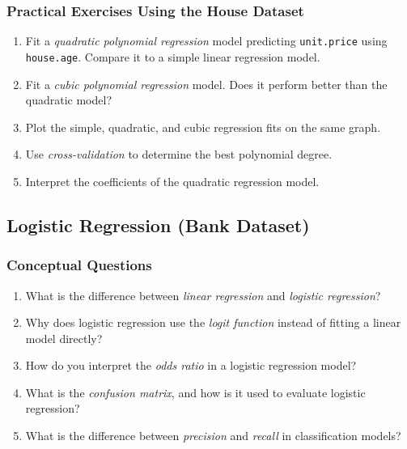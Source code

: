 \documentclass[
]{book}
\newcommand{\passthrough}[1]{#1}
\providecommand{\tightlist}{%
  \setlength{\itemsep}{0pt}\setlength{\parskip}{0pt}}
\theoremstyle{definition}
\theoremstyle{definition}
\theoremstyle{definition}
\theoremstyle{definition}
\theoremstyle{remark}
\begin{document}
\subsubsection*{Practical Exercises Using the House Dataset}\label{practical-exercises-using-the-house-dataset-1}

\begin{enumerate}
\def\labelenumi{\arabic{enumi}.}
\setcounter{enumi}{29}
\tightlist
\item
  Fit a \emph{quadratic polynomial regression} model predicting \passthrough{\lstinline!unit.price!} using \passthrough{\lstinline!house.age!}. Compare it to a simple linear regression model.\\
\item
  Fit a \emph{cubic polynomial regression} model. Does it perform better than the quadratic model?\\
\item
  Plot the simple, quadratic, and cubic regression fits on the same graph.\\
\item
  Use \emph{cross-validation} to determine the best polynomial degree.\\
\item
  Interpret the coefficients of the quadratic regression model.
\end{enumerate}

\subsection*{Logistic Regression (Bank Dataset)}\label{logistic-regression-bank-dataset}

\subsubsection*{Conceptual Questions}\label{conceptual-questions-8}

\begin{enumerate}
\def\labelenumi{\arabic{enumi}.}
\setcounter{enumi}{34}
\tightlist
\item
  What is the difference between \emph{linear regression} and \emph{logistic regression}?\\
\item
  Why does logistic regression use the \emph{logit function} instead of fitting a linear model directly?\\
\item
  How do you interpret the \emph{odds ratio} in a logistic regression model?\\
\item
  What is the \emph{confusion matrix}, and how is it used to evaluate logistic regression?\\
\item
  What is the difference between \emph{precision} and \emph{recall} in classification models?
\end{enumerate}
\end{document}
